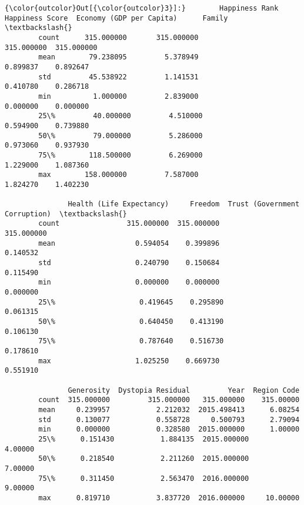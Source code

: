 \documentclass[11pt]{article}
\begin{document}
\begin{Verbatim}[commandchars=\\\{\}]
{\color{outcolor}Out[{\color{outcolor}3}]:}        Happiness Rank  Happiness Score  Economy (GDP per Capita)      Family  \textbackslash{}
        count      315.000000       315.000000                315.000000  315.000000   
        mean        79.238095         5.378949                  0.899837    0.892647   
        std         45.538922         1.141531                  0.410780    0.286718   
        min          1.000000         2.839000                  0.000000    0.000000   
        25\%         40.000000         4.510000                  0.594900    0.739880   
        50\%         79.000000         5.286000                  0.973060    0.937930   
        75\%        118.500000         6.269000                  1.229000    1.087360   
        max        158.000000         7.587000                  1.824270    1.402230   
        
               Health (Life Expectancy)     Freedom  Trust (Government Corruption)  \textbackslash{}
        count                315.000000  315.000000                     315.000000   
        mean                   0.594054    0.399896                       0.140532   
        std                    0.240790    0.150684                       0.115490   
        min                    0.000000    0.000000                       0.000000   
        25\%                    0.419645    0.295890                       0.061315   
        50\%                    0.640450    0.413190                       0.106130   
        75\%                    0.787640    0.516730                       0.178610   
        max                    1.025250    0.669730                       0.551910   
        
               Generosity  Dystopia Residual         Year  Region Code  
        count  315.000000         315.000000   315.000000    315.00000  
        mean     0.239957           2.212032  2015.498413      6.08254  
        std      0.130077           0.558728     0.500793      2.79094  
        min      0.000000           0.328580  2015.000000      1.00000  
        25\%      0.151430           1.884135  2015.000000      4.00000  
        50\%      0.218540           2.211260  2015.000000      7.00000  
        75\%      0.311450           2.563470  2016.000000      9.00000  
        max      0.819710           3.837720  2016.000000     10.00000  
\end{Verbatim}
            
\end{document}
